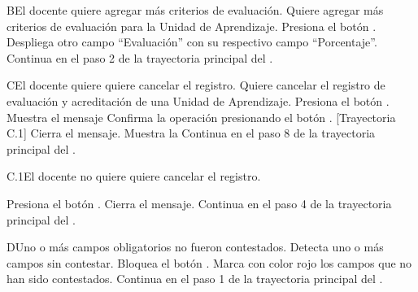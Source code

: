 
\begin{UCtrayectoriaA}{B}{El docente quiere agregar más criterios de evaluación.}
    \UCpaso[\UCactor] Quiere agregar más criterios de evaluación para la Unidad de Aprendizaje.
    \UCpaso[\UCactor] Presiona el botón .
    \UCpaso Despliega otro campo ``Evaluación'' con su respectivo campo ``Porcentaje''.
    \UCpaso Continua en el paso 2 de la trayectoria principal del .
\end{UCtrayectoriaA}


\begin{UCtrayectoriaA}{C}{El docente quiere quiere cancelar el registro.}
    \UCpaso[\UCactor] Quiere cancelar el registro de evaluación y acreditación de una Unidad de Aprendizaje.
    \UCpaso[\UCactor] Presiona el botón .
    \UCpaso Muestra el mensaje 
    \UCpaso[\UCactor] Confirma la operación presionando el botón . [Trayectoria C.1]
    \UCpaso Cierra el mensaje.
    \UCpaso Muestra la 
    \UCpaso Continua en el paso 8 de la trayectoria principal del .
\end{UCtrayectoriaA}


\begin{UCtrayectoriaA}{C.1}{El docente no quiere quiere cancelar el registro.}

    \UCpaso[\UCactor] Presiona el botón .
    \UCpaso Cierra el mensaje.
    \UCpaso Continua en el paso 4 de la trayectoria principal del .
\end{UCtrayectoriaA}


\begin{UCtrayectoriaA}{D}{Uno o más campos obligatorios no fueron contestados.}
    \UCpaso Detecta uno o más campos sin contestar.
    \UCpaso Bloquea el botón .
    \UCpaso Marca con color rojo los campos que no han sido contestados.
    \UCpaso Continua en el paso 1 de la trayectoria principal del .
\end{UCtrayectoriaA}


